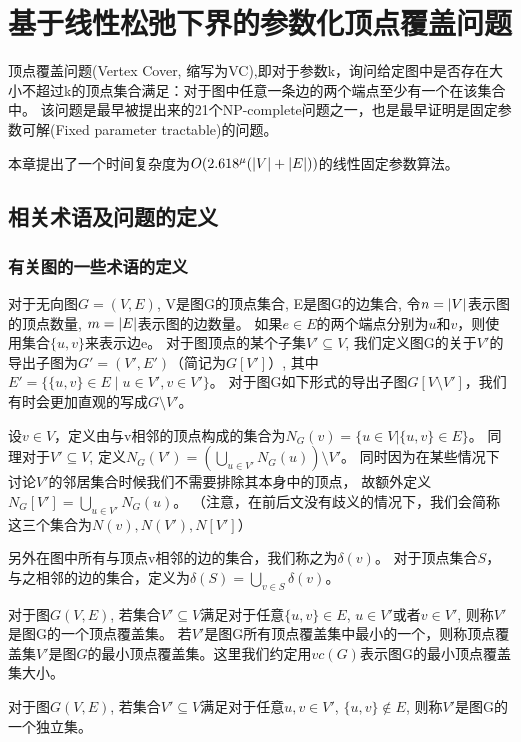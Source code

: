 \chapter{基于线性松弛下界的参数化顶点覆盖问题}
顶点覆盖问题(Vertex Cover, 缩写为VC),即对于参数k，询问给定图中是否存在大小不超过k的顶点集合满足：对于图中任意一条边的两个端点至少有一个在该集合中。
该问题是最早被提出来的21个NP-complete问题之一\cite{karp1972reducibility}，也是最早证明是固定参数可解(Fixed parameter tractable)的问题\cite{downey2012parameterized}。

本章提出了一个时间复杂度为$O(2.618^{\mu}(\left\vert V \right\vert + \left\vert E \right\vert))$的线性固定参数算法。

\section{相关术语及问题的定义}
\subsection{有关图的一些术语的定义}
对于无向图$G=(V,E)$, V是图G的顶点集合, E是图G的边集合, 令$n = \left\vert V \right\vert$表示图的顶点数量, $m = \left\vert E \right\vert$表示图的边数量。
如果$e \in E$的两个端点分别为$u$和$v$，则使用集合$\{u, v \}$来表示边e。
对于图顶点的某个子集$V' \subseteq V$, 我们定义图G的关于$V'$的导出子图为$G' = (V', E')$（简记为$G[V']$）, 其中$E' = \{\{u, v\} \in E\;|\;u \in V', v \in V' \}$。
对于图G如下形式的导出子图$G[V \setminus V']$，我们有时会更加直观的写成$G \setminus V'$。

设$v \in V$，定义由与v相邻的顶点构成的集合为$N_{G}(v) = \{ u \in V | \{u, v\} \in E\}$。
同理对于$V' \subseteq V$, 定义$N_{G}(V') = (\bigcup_{u \in V'}N_{G}(u)) \setminus V' $。
同时因为在某些情况下讨论$V'$的邻居集合时候我们不需要排除其本身中的顶点，
故额外定义$N_{G}[V'] = \bigcup_{u \in V'}N_{G}(u)$。
（注意，在前后文没有歧义的情况下，我们会简称这三个集合为$N(v), N(V'),N[V']$）

另外在图中所有与顶点v相邻的边的集合，我们称之为$\delta(v)$。
对于顶点集合$S$，与之相邻的边的集合，定义为$\delta(S) = \bigcup_{v \in S}\delta(v)$。

\begin{definition}[顶点覆盖集]
对于图$G(V, E)$, 若集合$V' \subseteq V$满足对于任意$\{u, v\} \in E$, $u \in V'$或者$v \in V'$, 则称$V'$是图G的一个顶点覆盖集。
若$V'$是图G所有顶点覆盖集中最小的一个，则称顶点覆盖集$V'$是图$G$的最小顶点覆盖集。这里我们约定用$vc(G)$表示图G的最小顶点覆盖集大小。
\end{definition}

\begin{definition}[独立集]
对于图$G(V, E)$, 若集合$V' \subseteq V$满足对于任意$u, v \in V'$, $\{u, v\} \notin E$, 则称$V'$是图G的一个独立集。
\end{definition}

